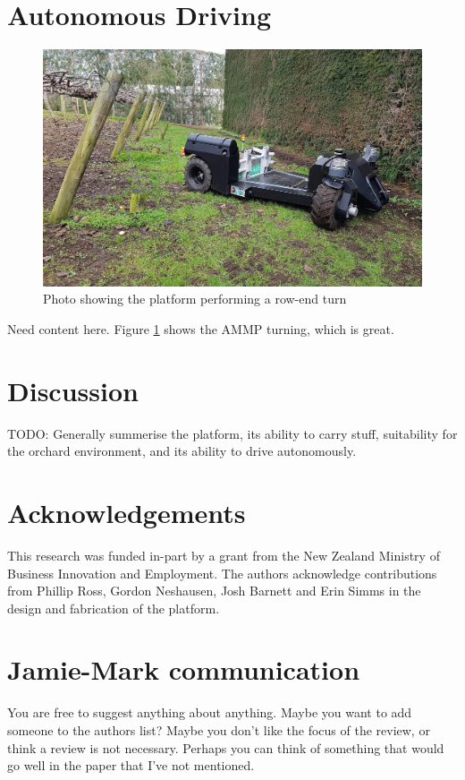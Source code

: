 \documentclass[preprint,authoryear,12pt]{elsarticle}
\begin{document}
\section{Autonomous Driving}
\label{sect:autonomous}
    \begin{figure}[htb]
        \centering
        \includegraphics[width=\linewidth]{imgs/photos/suzy_turning.jpg}
        \caption{
            Photo showing the platform performing a row-end turn
        }
        \label{fig:suzy_turning}
    \end{figure}
    \color{red}
    Need content here.
    \color{black}
    Figure \ref{fig:suzy_turning} shows the AMMP turning, which is great.


\section{Discussion}
    TODO: Generally summerise the platform, its ability to carry stuff, suitability for the orchard environment, and its ability to drive autonomously.

\section*{Acknowledgements}
This research was funded in-part by a grant from the New Zealand Ministry of Business Innovation and Employment.
The authors acknowledge contributions from Phillip Ross, Gordon Neshausen, Josh Barnett and Erin Simms in the design and fabrication of the platform.

\section{Jamie-Mark communication}
You are free to suggest anything about anything.
Maybe you want to add someone to the authors list?
Maybe you don't like the focus of the review, or think a review is not necessary.
Perhaps you can think of something that would go well in the paper that I've not mentioned.
\end{document}
